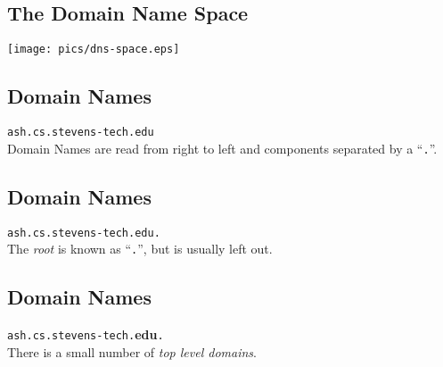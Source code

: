 \documentclass[xga]{xdvislides}
\begin{document}
\subsection{The Domain Name Space}
\vspace*{\fill}
\begin{center}
	\texttt{[image: pics/dns-space.eps]}
\end{center}
\vspace*{\fill}

\subsection{Domain Names}
\vspace{.5in}
\begin{center}
	\Huge
	\verb+ash.cs.stevens-tech.edu+ \\
	\vspace{.5in}
	Domain Names are read from right to left and components separated by a ``\verb+.+''.
\end{center}
\Normalsize

\subsection{Domain Names}
\vspace{.5in}
\begin{center}
	\Huge
	\verb+ash.cs.stevens-tech.edu.+ \\
	\vspace{.5in}
	The {\em root} is known as ``\verb+.+'', but is usually left out.
\end{center}
\Normalsize

\subsection{Domain Names}
\vspace{.5in}
\begin{center}
	\Huge
	\verb+ash.cs.stevens-tech.+{\bf edu}\verb+.+ \\
	\vspace{.5in}
	There is a small number of {\em top level domains}.
\end{center}
\Normalsize
\end{document}
